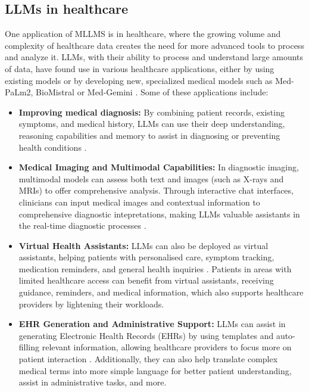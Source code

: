 \FloatBarrier
\clearpage


\subsection{LLMs in healthcare}

One application of MLLMS is in healthcare, where the growing volume and complexity of healthcare data creates the need for more advanced tools to process and analyze it. LLMs, with their ability to process and understand large amounts of data, have found use in various healthcare applications, either by using existing models or by developing new, specialized medical models such as Med-PaLm2, BioMistral or Med-Gemini \parencite{biomistral,medgemini,medpalm2}. Some of these applications include:

\begin{itemize}
    \item \textbf{Improving medical diagnosis:} By combining patient records, existing symptoms, and medical history, LLMs can use their deep understanding, reasoning capabilities and memory to assist in diagnosing or preventing health conditions \parencite{llm_healthcare,llm_healthcare3,llm_healthcare4}.
    \item \textbf{Medical Imaging and Multimodal Capabilities:} In diagnostic imaging, multimodal models can assess both text and images (such as X-rays and MRIs) to offer comprehensive analysis. Through interactive chat interfaces, clinicians can input medical images and contextual information to comprehensive diagnostic intepretations, making LLMs valuable assistants in the real-time diagnostic processes \parencite{llm_healthcare3}.
    \item \textbf{Virtual Health Assistants:} LLMs can also be deployed as virtual assistants, helping patients with personalised care, symptom tracking, medication reminders, and general health inquiries \parencite{llm_healthcare,llm_healthcare3}. Patients in areas with limited healthcare access can benefit from virtual assistants, receiving guidance, reminders, and medical information, which also supports healthcare providers by lightening their workloads.
    \item \textbf{EHR Generation and Administrative Support:} LLMs can assist in generating Electronic Health Records (EHRs) by using templates and auto-filling relevant information, allowing healthcare providers to focus more on patient interaction \parencite{llm_healthcare4}. Additionally, they can also help translate complex medical terms into more simple language for better patient understanding, assist in administrative tasks, and more.
\end{itemize}

